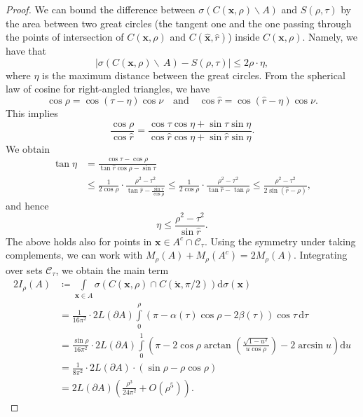 \documentclass[a4paper,11pt]{amsart}
\begin{document}
\begin{proof}
We can bound the difference between $\sigma\left(C(\mathbf{x},\rho)\backslash A\right)$ and $S(\rho,\tau)$ by the area between two great circles (the tangent one and the one passing through the points of intersection of $C(\mathbf{x},\rho)$ and $C(\hat{\mathbf{x}},\hat{r})$) inside $C(\mathbf{x},\rho)$. Namely, we have that
    \begin{equation*}
         \left|\sigma (C\left(\mathbf{x},\rho\right)\backslash\, A)-S(\rho,\tau)\right|\leq 2\rho\cdot \eta,
    \end{equation*}
    where $\eta$ is the maximum distance between the great circles. 
    From the spherical law of cosine for right-angled triangles, we have 
    $$
    \cos \rho=\cos(\tau-\eta)\cos \nu\quad \text{and}\quad \cos \hat{r}=\cos(\hat{r}-\eta)\cos \nu.
    $$
    This implies 
    $$
    \frac{\cos \rho}{\cos\hat{r}}=\frac{\cos\tau\cos\eta+\sin\tau\sin\eta}{\cos\hat{r}\cos\eta+\sin\hat{r}\sin\eta}.
    $$
 We obtain 
    \begin{align*}
        \tan \eta & =\frac{\cos \tau-\cos \rho}{\tan \hat r \cos \rho -\sin \tau}\\
        &\leq\frac{1}{2\cos \rho}\cdot\frac{\rho^2-\tau^2}{\tan\hat r-\frac{\sin \tau}{\cos \rho}}\leq \frac{1}{2\cos \rho}
        \cdot \frac{\rho^2-\tau^2}{\tan \hat r-\tan\rho}\leq\frac{\rho^2-\tau^2}{2\sin(\hat r-\rho)},
    \end{align*}
and hence
\begin{equation*}
    \eta\leq \frac{\rho^2-\tau^2}{\sin \hat r}.
\end{equation*}
    The above holds also for points in $\mathbf{x}\in A^{c}\cap\mathcal{C}_\tau$. Using the symmetry under taking complements, we can work with $M_\rho(A)+M_\rho(A^c)=2M_\rho(A).$ Integrating over sets $\mathcal{C}_\tau$, we obtain the main term
\begin{align*}
    2I_\rho(A)&\coloneqq\int\limits_{\mathbf{x}\in A}\sigma\left( {C}(\mathbf{x},\rho)\cap C(\mathring{\mathbf{x}},\pi/2)\right)\mathrm{d}\sigma(\mathbf{x})
    \\ &=\frac{1}{16\pi^2}\cdot 2L(\partial A)\int\limits_{0}^\rho\left(\pi-\alpha(\tau) \cos \rho-2\beta(\tau)\right)\cos \tau\,\mathrm{d}\tau\\ &=\frac{\sin \rho}{16\pi^2}\cdot 2L(\partial A)\int\limits_{0}^1\left(\pi-2\cos\rho\arctan\left(\frac{\sqrt{1-u^2}}{u\cos\rho}\right)-2\arcsin u\right) \mathrm{d}u
    \\&=\frac{1}{8\pi^2}\cdot2L(\partial A)\cdot(\sin \rho-\rho\cos \rho)
    \\&=2L(\partial A)\left(\frac{\rho^3}{24\pi^2}+O(\rho^5)\right).

\end{align*}
\end{proof}
\end{document}
